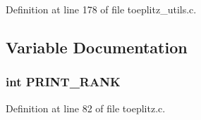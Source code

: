Definition at line 178 of file toeplitz\-\_\-utils.\-c.



\subsection{Variable Documentation}
\subsubsection[{P\-R\-I\-N\-T\-\_\-\-R\-A\-N\-K}]{\setlength{\rightskip}{0pt plus 5cm}int P\-R\-I\-N\-T\-\_\-\-R\-A\-N\-K}\label{toeplitz__utils_8c_a300d52d9923297872ffb24962a0f0ce6}


Definition at line 82 of file toeplitz.\-c.

